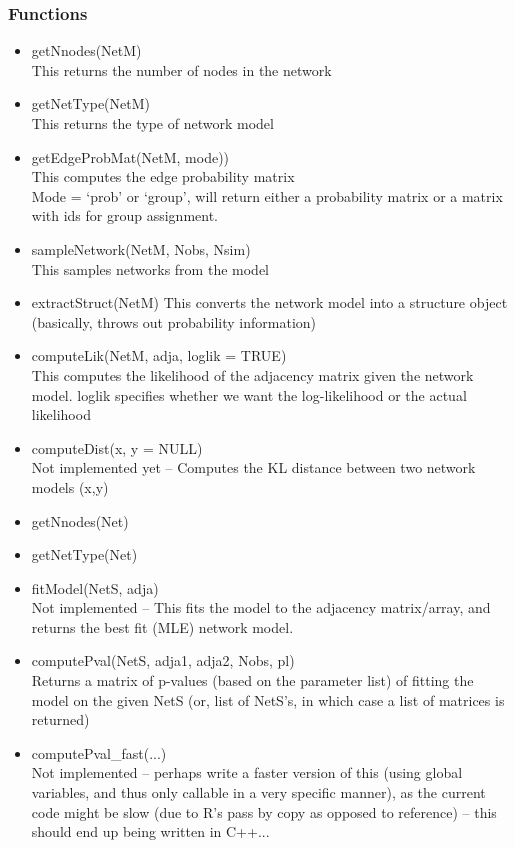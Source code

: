 \documentclass[11pt]{article}
\begin{document}
\subsubsection{Functions}
\begin{itemize} 
\item getNnodes(NetM)\\
This returns the number of nodes in the network
\item getNetType(NetM)\\
This returns the type of network model
\item getEdgeProbMat(NetM, mode))\\
This computes the edge probability matrix\\
Mode = `prob' or `group', will return either a probability matrix or a matrix with ids for group assignment. 
\item sampleNetwork(NetM, Nobs, Nsim)\\
This samples networks from the model
\item extractStruct(NetM)
This converts the network model into a structure object (basically, throws out probability information)
\item computeLik(NetM, adja, loglik = TRUE)\\
This computes the likelihood of the adjacency matrix given the network model. loglik specifies whether we want the log-likelihood or the actual likelihood
\item computeDist(x, y = NULL) \\
Not implemented yet -- Computes the KL distance between two network models (x,y)

\item getNnodes(Net)
\item getNetType(Net)
\item fitModel(NetS, adja)\\
Not implemented -- This fits the model to the adjacency matrix/array, and returns the best fit (MLE) network model. 
\item computePval(NetS, adja1, adja2, Nobs, pl)\\
Returns a matrix of p-values (based on the parameter list) of fitting the model on the given NetS (or, list of NetS's, in which case a list of matrices is returned)
\item computePval\_fast(...)\\
Not implemented -- perhaps write a faster version of this (using global variables, and thus only callable in a very specific manner), as the current code might be slow (due to R's pass by copy as opposed to reference) -- this should end up being written in C++... 
\end{itemize}
\end{document}
